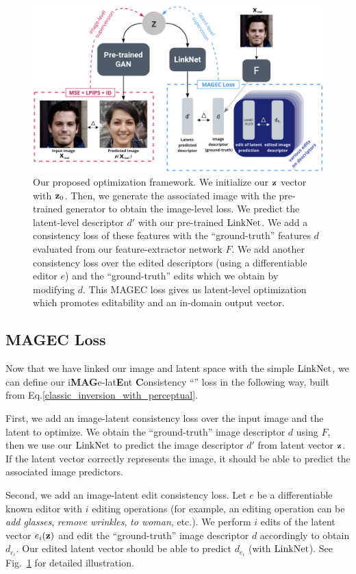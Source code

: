 \begin{figure}
  \centering
    \includegraphics[width=\textwidth]{images/magec/training_protocol9.png}
    \caption{Our proposed optimization framework. We initialize our $\mathbf{z}$ vector with $\mathbf{z}_0$. Then, we generate the associated image with the pre-trained generator to obtain the image-level loss. We predict the latent-level descriptor $d'$ with our pre-trained $\mathrm{LinkNet}$. We add a consistency loss of these features with the ``ground-truth'' features $d$ evaluated from our feature-extractor network $F$. We add another consistency loss over the edited descriptors (using a differentiable editor $e$) and the ``ground-truth'' edits which we obtain by modifying $d$. This MAGEC loss gives us latent-level optimization which promotes editability and an in-domain output vector.}
    \label{fig:training_protocol}
\end{figure}


\subsection{MAGEC Loss}
Now that we have linked our image and latent space with the simple $\mathrm{LinkNet}$,
 we can define our i\textbf{MAG}e-lat\textbf{E}nt \textbf{C}onsistency ``\magec''
  loss in the following way, built from Eq.\ref{classic_inversion_with_perceptual}. 

First, we add an image-latent consistency loss over the input image and the 
latent to optimize. We obtain the ``ground-truth'' image descriptor $d$ using $F$, 
then we use our $\mathrm{LinkNet}$ to predict the image descriptor $d'$ from latent vector
 $\mathbf{z}$. If the latent vector correctly represents the image, it should be able to 
 predict the associated image predictors.


Second, we add an image-latent edit consistency loss. Let $e$ be a differentiable 
known editor with $i$ editing operations (for example, an editing operation can 
be \emph{add glasses}, \emph{remove wrinkles}, \emph{to woman}, etc.). We
 perform $i$ edits of the latent vector $e_i(\mathbf{z})$ and edit the 
 ``ground-truth'' image descriptor $d$ accordingly to obtain
  $d_{e_i}$. Our edited latent vector should be able to predict $d_{e_i}$
   (with $\mathrm{LinkNet}$). See Fig.~\ref{fig:training_protocol} for detailed
    illustration.

